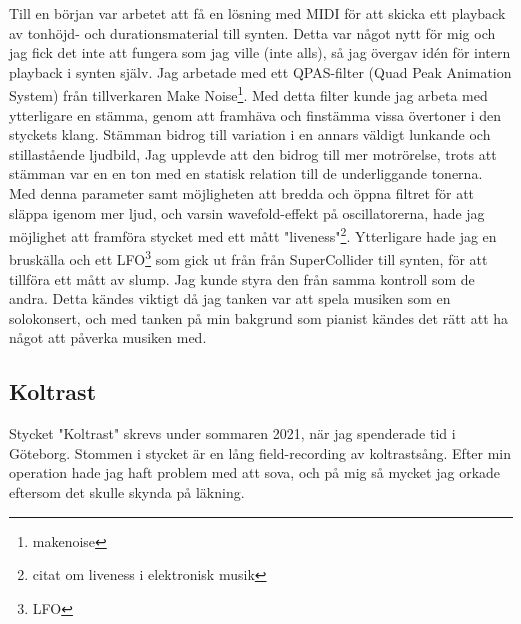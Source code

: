 \documentclass{article}
\begin{document}
		Till en början var arbetet att få en lösning med MIDI för att skicka ett playback av tonhöjd- och
		durationsmaterial till synten. Detta var något nytt för mig och jag fick det inte att fungera som jag
		ville (inte alls), så jag övergav idén för intern playback i synten själv. 
		Jag arbetade med ett QPAS-filter (Quad Peak Animation System) från tillverkaren Make
		Noise\footnote{makenoise}. Med detta filter kunde jag arbeta med ytterligare en stämma, genom att
		framhäva och finstämma vissa övertoner i den styckets klang. Stämman bidrog till variation i en
		annars väldigt lunkande och stillastående ljudbild, Jag upplevde att den bidrog till mer motrörelse,
		trots att stämman var en en ton med en statisk relation till de underliggande tonerna. Med denna
		parameter samt möjligheten att bredda och öppna filtret för att släppa igenom mer ljud, och varsin
		wavefold-effekt på oscillatorerna, hade jag möjlighet att framföra stycket med ett mått
		"liveness"\footnote{citat om liveness i elektronisk musik}. Ytterligare hade jag en bruskälla och ett
		LFO\footnote{LFO} som gick ut från från SuperCollider till synten, för att tillföra ett mått av slump.
		Jag kunde styra den från samma kontroll som de andra. Detta kändes viktigt då jag tanken var att
		spela musiken som en solokonsert, och med tanken på min bakgrund som pianist kändes det rätt att ha
		något att påverka musiken med. 

	\subsection{Koltrast}
	Stycket "Koltrast" skrevs under sommaren 2021, när jag spenderade tid i Göteborg. Stommen i stycket är en
	lång field-recording av koltrastsång. Efter min operation hade jag haft problem med att sova, och
	på mig så mycket jag orkade eftersom det skulle skynda på läkning. 
\end{document}

